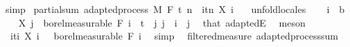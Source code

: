 \begin{isabellebody}
\ simp\isanewline
{}\isamarkupfalse%
%
\endisatagproof
{\isafoldproof}%
%
\isadelimproof
\isanewline
%
\endisadelimproof
\isanewline
{}\isamarkupfalse%
\ partial{\isacharunderscore}{\kern0pt}sum{\isacharprime}{\kern0pt}{\isacharcolon}{\kern0pt}\ {\isachardoublequoteopen}adapted{\isacharunderscore}{\kern0pt}process\ M\ F\ t\ {\isacharparenleft}{\kern0pt}{\isasymlambda}n\ {\isasymxi}{\isachardot}{\kern0pt}\ {\isasymSum}i{\isasymin}{\isacharbraceleft}{\kern0pt}tn{\isacharbraceright}{\kern0pt}{\isachardot}{\kern0pt}\ X\ i\ {\isasymxi}{\isacharparenright}{\kern0pt}{\isachardoublequoteclose}\ \isanewline
%
\isadelimproof
%
\endisadelimproof
%
\isatagproof
{}\isamarkupfalse%
\ {\isacharparenleft}{\kern0pt}unfold{\isacharunderscore}{\kern0pt}locales{\isacharparenright}{\kern0pt}\isanewline
\ \ \isamarkupfalse%
\ i\ {\isacharcolon}{\kern0pt}{\isacharcolon}{\kern0pt}\ {\isacharprime}{\kern0pt}b\isanewline
\ \ \isamarkupfalse%
\ {\isachardoublequoteopen}X\ j\ {\isasymin}\ borel{\isacharunderscore}{\kern0pt}measurable\ {\isacharparenleft}{\kern0pt}F\ i{\isacharparenright}{\kern0pt}{\isachardoublequoteclose}\ \ {\isachardoublequoteopen}t\ {\isasymle}\ j{\isachardoublequoteclose}\ {\isachardoublequoteopen}j\ {\isasymle}\ i{\isachardoublequoteclose}\ \ j\ \isamarkupfalse%
\ that\ adaptedE\ \isamarkupfalse%
\ meson\isanewline
\ \ \isamarkupfalse%
\ {\isachardoublequoteopen}{\isacharparenleft}{\kern0pt}{\isasymlambda}{\isasymxi}{\isachardot}{\kern0pt}\ {\isasymSum}i{\isasymin}{\isacharbraceleft}{\kern0pt}ti{\isacharbraceright}{\kern0pt}{\isachardot}{\kern0pt}\ X\ i\ {\isasymxi}{\isacharparenright}{\kern0pt}\ {\isasymin}\ borel{\isacharunderscore}{\kern0pt}measurable\ {\isacharparenleft}{\kern0pt}F\ i{\isacharparenright}{\kern0pt}{\isachardoublequoteclose}\ \isamarkupfalse%
\ simp\isanewline
{}\isamarkupfalse%
%
\endisatagproof
{\isafoldproof}%
%
\isadelimproof
\isanewline
%
\endisadelimproof
\isanewline
{}\isamarkupfalse%
\isanewline
\isanewline
{}\isamarkupfalse%
\ {\isacharparenleft}{\kern0pt}\ filtered{\isacharunderscore}{\kern0pt}measure{\isacharparenright}{\kern0pt}\ adapted{\isacharunderscore}{\kern0pt}process{\isacharunderscore}{\kern0pt}sum{\isacharcolon}{\kern0pt}\isanewline

\end{isabellebody}
